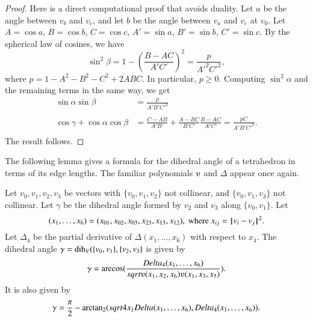 \begin{proof}  
Here is a direct
computational proof that avoids duality.
Let $a$ be the angle between $v_b$ and $v_c$, and let $b$ be the angle
between $v_a$ and $v_c$ at $v_0$.
Let $A=\cos a$, $B=\cos b$, $C=\cos c$,
$A'=\sin a$, $B'=\sin b$, $C'=\sin c$.  By the
spherical law of cosines, we have
   $$\sin^2\beta = 1-\left(\frac{B-A C}{A' C'}\right)^2
     = \frac{p}{A'^2 C'^2},$$
where $p=1-A^2 - B^2 - C^2 + 2 A B C$.
In particular, $p\ge 0$.
Computing $\sin^2\alpha$ and the remaining terms in the same way, we get
   $$
   \begin{array}{lll}
     \sin\alpha\sin\beta &= \frac{p}{A' B' C'^2}\\ 
      \\
     \cos\gamma + \cos\alpha \cos\beta &=
         \frac{C - A B}{A' B'} + \frac{A - B C}{B' C'} \frac{B - A C}{A' C'}
         = \frac{p C}{A' B' C'^2}.\\
   \end{array}
   $$
The result follows.
\end{proof}

The following lemma gives a formula for the dihedral angle
of a tetrahedron in terms of its edge lengths.  The
familiar polynomials $\ups$ and $\Delta$ appear once again.


\begin{lemma} \label{lemma:dihform}
Let $v_0,v_1,v_2,v_3$ 
be vectors with $\{v_0,v_1,v_2\}$ not collinear, 
and $\{v_0,v_1,v_3\}$ not
collinear. 
Let $\gamma$ be the dihedral angle formed
by $v_2$ and $v_3$ along $\{v_0,v_1\}$. Let
    $$(x_1,\ldots,x_6) = 
    (x_{01},x_{02},x_{03},x_{23},x_{13},x_{12}),
    \text{ where } x_{ij}={\hskip0.1em|\hskip-0.15em|\hskip0.1em}v_i - v_j{\hskip0.1em|\hskip-0.15em|\hskip0.1em}^2.$$
Let $\Delta_4$ be the partial derivative of $\Delta(x_1,\ldots,x_6)$ with
respect to $x_4$.
The dihedral angle $\gamma=\operatorname{dih}_V(\{v_0,v_1\},\{v_2,v_3\}$
is given by
    $$
    \gamma=\arccos(\frac{\Delta_4(x_1,\ldots,x_6)}{\sqrt{
    \ups(x_1,x_2,x_6)\ups(x_1,x_3,x_5)}}).
    $$
It is also given by
    $$
    \gamma=\frac{\pi}{2} - {\operatorname{arctan_2}}
     ({sqrt{4 x_1 Delta(x_1,\ldots,x_6)}},{Delta_4(x_1,\ldots,x_6)}).
    $$
\end{lemma}


